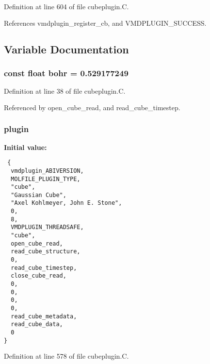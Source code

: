 Definition at line 604 of file cubeplugin.C.

References vmdplugin\_\-register\_\-cb, and VMDPLUGIN\_\-SUCCESS.

\subsection{Variable Documentation}
\subsubsection{\setlength{\rightskip}{0pt plus 5cm}const float bohr = 0.529177249\hspace{0.3cm}{\tt  [static]}}\label{cubeplugin_8C_a1}




Definition at line 38 of file cubeplugin.C.

Referenced by open\_\-cube\_\-read, and read\_\-cube\_\-timestep.
\subsubsection{ plugin\hspace{0.3cm}{\tt  [static]}}\label{cubeplugin_8C_a2}


{\bf Initial value:}

\footnotesize\begin{verbatim} {
  vmdplugin_ABIVERSION,   
  MOLFILE_PLUGIN_TYPE,    
  "cube",                 
  "Gaussian Cube",        
  "Axel Kohlmeyer, John E. Stone", 
  0,                      
  8,                      
  VMDPLUGIN_THREADSAFE,   
  "cube",                 
  open_cube_read,               
  read_cube_structure,
  0,                      
  read_cube_timestep,
  close_cube_read,
  0,                      
  0,                      
  0,                      
  0,                      
  read_cube_metadata,
  read_cube_data,
  0                       
}\end{verbatim}\normalsize 


Definition at line 578 of file cubeplugin.C.